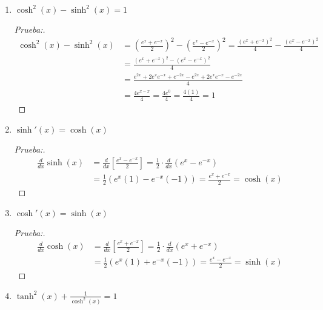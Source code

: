\documentclass[12pt]{article}
\begin{document}
\begin{enumerate}[\hspace{9px} a)]
    \item \(\cosh^2(x)-\sinh^2(x)=1\)
    
        \begin{proof}[Prueba:]
            \begin{align*}
                \cosh^2(x)-\sinh^2(x) &= \left(\frac{e^x+e^{-x}}{2}\right)^2-\left(\frac{e^x-e^{-x}}{2}\right)^2 = \frac{(e^x+e^{-x})^2}{4} - \frac{(e^x-e^{-x})^2}{4}\\
                &= \frac{(e^x+e^{-x})^2-(e^x-e^{-x})^2}{4} \\
                &= \frac{e^{2x}+2e^xe^{-x}+e^{-2x}-e^{2x}+2e^xe^{-x}-e^{-2x}}{4}\\
                &= \frac{4e^{x-x}}{4} = \frac{4e^0}{4} = \frac{4(1)}{4} = 1
            \end{align*}
        \end{proof}

    \item \(\sinh'(x)=\cosh(x)\)
    
        \begin{proof}[Prueba:]
            \begin{align*}
                \frac{d}{dx}\sinh(x) &= \frac{d}{dx}\left[\frac{e^x-e^{-x}}{2}\right] = \frac{1}{2}\cdot\frac{d}{dx}(e^x-e^{-x})\\
                &= \frac{1}{2}(e^x(1)-e^{-x}(-1)) = \frac{e^x+e^{-x}}{2} = \cosh(x)
            \end{align*}
        \end{proof}

    \item \(\cosh'(x)=\sinh(x)\) 
    
        \begin{proof}[Prueba:]
            \begin{align*}
                \frac{d}{dx}\cosh(x) &= \frac{d}{dx}\left[\frac{e^x+e^{-x}}{2}\right] = \frac{1}{2}\cdot\frac{d}{dx}(e^x+e^{-x})\\
                &= \frac{1}{2}(e^x(1)+e^{-x}(-1)) = \frac{e^x-e^{-x}}{2} = \sinh(x)
            \end{align*}
        \end{proof}

    \item \(\tanh^2(x)+\displaystyle\frac{1}{\cosh^2(x)}=1\)
    

\end{enumerate}
\end{document}
